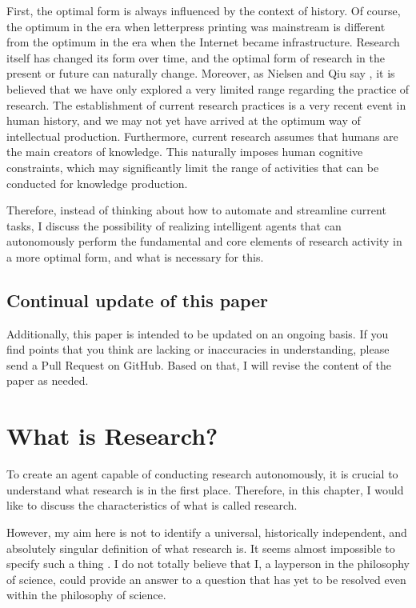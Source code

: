 \documentclass{book}
\begin{document}
First, the optimal form is always influenced by the context of history. Of course, the optimum in the era when letterpress printing was mainstream is different from the optimum in the era when the Internet became infrastructure. Research itself has changed its form over time, and the optimal form of research in the present or future can naturally change. Moreover, as Nielsen and Qiu say \cite{nielsen}, it is believed that we have only explored a very limited range regarding the practice of research. The establishment of current research practices is a very recent event in human history, and we may not yet have arrived at the optimum way of intellectual production. Furthermore, current research assumes that humans are the main creators of knowledge. This naturally imposes human cognitive constraints, which may significantly limit the range of activities that can be conducted for knowledge production. 

Therefore, instead of thinking about how to automate and streamline current tasks, I discuss the possibility of realizing intelligent agents that can autonomously perform the fundamental and core elements of research activity in a more optimal form, and what is necessary for this.

\section{Continual update of this paper}

Additionally, this paper is intended to be updated on an ongoing basis. If you find points that you think are lacking or inaccuracies in understanding, please send a Pull Request on GitHub. Based on that, I will revise the content of the paper as needed.


\chapter{What is Research?}

To create an agent capable of conducting research autonomously, it is crucial to understand what research is in the first place. Therefore, in this chapter, I would like to discuss the characteristics of what is called research.

However, my aim here is not to identify a universal, historically independent, and absolutely singular definition of what research is. It seems almost impossible to specify such a thing \cite{chalmers2013thing,sep-scientific-method}. I do not totally believe that I, a layperson in the philosophy of science, could provide an answer to a question that has yet to be resolved even within the philosophy of science.
\end{document}
